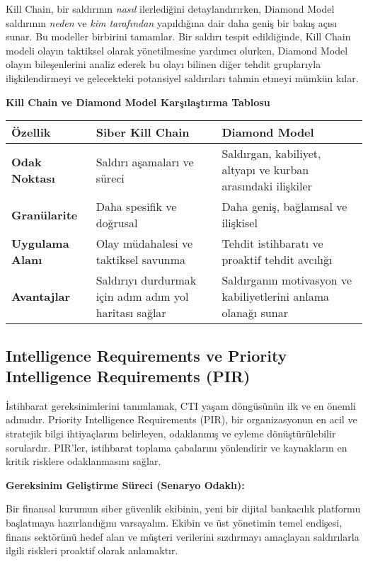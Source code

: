 Kill Chain, bir saldırının \textit{nasıl} ilerlediğini detaylandırırken, Diamond Model saldırının \textit{neden} ve \textit{kim tarafından} yapıldığına dair daha geniş bir bakış açısı sunar. Bu modeller birbirini tamamlar. Bir saldırı tespit edildiğinde, Kill Chain modeli olayın taktiksel olarak yönetilmesine yardımcı olurken, Diamond Model olayın bileşenlerini analiz ederek bu olayı bilinen diğer tehdit gruplarıyla ilişkilendirmeyi ve gelecekteki potansiyel saldırıları tahmin etmeyi mümkün kılar.

\textbf{Kill Chain ve Diamond Model Karşılaştırma Tablosu}

\begin{tabularx}{\textwidth}{|l|X|X|}
\hline
\textbf{Özellik} & \textbf{Siber Kill Chain} & \textbf{Diamond Model} \\
\hline
\textbf{Odak Noktası} & Saldırı aşamaları ve süreci & Saldırgan, kabiliyet, altyapı ve kurban arasındaki ilişkiler \\
\hline
\textbf{Granülarite} & Daha spesifik ve doğrusal & Daha geniş, bağlamsal ve ilişkisel \\
\hline
\textbf{Uygulama Alanı} & Olay müdahalesi ve taktiksel savunma & Tehdit istihbaratı ve proaktif tehdit avcılığı \\
\hline
\textbf{Avantajlar} & Saldırıyı durdurmak için adım adım yol haritası sağlar & Saldırganın motivasyon ve kabiliyetlerini anlama olanağı sunar \\
\hline
\end{tabularx}

\subsection{Intelligence Requirements ve Priority Intelligence Requirements (PIR)}

İstihbarat gereksinimlerini tanımlamak, CTI yaşam döngüsünün ilk ve en önemli adımıdır. Priority Intelligence Requirements (PIR), bir organizasyonun en acil ve stratejik bilgi ihtiyaçlarını belirleyen, odaklanmış ve eyleme dönüştürülebilir sorulardır. PIR'ler, istihbarat toplama çabalarını yönlendirir ve kaynakların en kritik risklere odaklanmasını sağlar.

\textbf{Gereksinim Geliştirme Süreci (Senaryo Odaklı):}

Bir finansal kurumun siber güvenlik ekibinin, yeni bir dijital bankacılık platformu başlatmaya hazırlandığını varsayalım. Ekibin ve üst yönetimin temel endişesi, finans sektörünü hedef alan ve müşteri verilerini sızdırmayı amaçlayan saldırılarla ilgili riskleri proaktif olarak anlamaktır.

